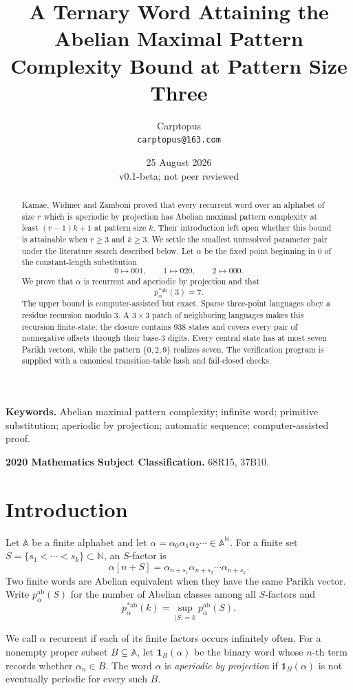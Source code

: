 \documentclass[11pt]{article}
\title{A Ternary Word Attaining the Abelian Maximal Pattern\\
Complexity Bound at Pattern Size Three}
\author{Carptopus\\\small\texttt{carptopus@163.com}}
\date{25 August 2026\\\small v0.1-beta; not peer reviewed}
\newcommand{\A}{\mathbb A}
\newcommand{\N}{\mathbb N}
\newcommand{\one}{\mathbf 1}
\begin{document}
\maketitle

\begin{abstract}
Kamae, Widmer and Zamboni proved that every recurrent word over an alphabet of
size $r$ which is aperiodic by projection has Abelian maximal pattern
complexity at least $(r-1)k+1$ at pattern size $k$. Their introduction left
open whether this bound is attainable when $r\ge3$ and $k\ge3$. We settle the
smallest unresolved parameter pair under the literature search described
below. Let $\alpha$ be the fixed point beginning in $0$ of the constant-length
substitution
\[
0\mapsto001,\qquad 1\mapsto020,\qquad 2\mapsto000.
\]
We prove that $\alpha$ is recurrent and aperiodic by projection and that
\[
p_{\alpha}^{*\mathrm{ab}}(3)=7.
\]
The upper bound is computer-assisted but exact. Sparse three-point languages
obey a residue recursion modulo $3$. A $3\times3$ patch of neighboring
languages makes this recursion finite-state; the closure contains 938 states
and covers every pair of nonnegative offsets through their base-$3$ digits.
Every central state has at most seven Parikh vectors, while the pattern
$\{0,2,9\}$ realizes seven. The verification program is supplied with a
canonical transition-table hash and fail-closed checks.
\end{abstract}

\noindent\textbf{Keywords.} Abelian maximal pattern complexity; infinite word;
primitive substitution; aperiodic by projection; automatic sequence;
computer-assisted proof.

\medskip
\noindent\textbf{2020 Mathematics Subject Classification.} 68R15, 37B10.

\section{Introduction}

Let $\A$ be a finite alphabet and let
$\alpha=\alpha_0\alpha_1\alpha_2\cdots\in\A^{\N}$. For a finite set
$S=\{s_1<\cdots<s_k\}\subset\N$, an $S$-factor is
\[
\alpha[n+S]=\alpha_{n+s_1}\alpha_{n+s_2}\cdots\alpha_{n+s_k}.
\]
Two finite words are Abelian equivalent when they have the same Parikh vector.
Write $p_\alpha^{\mathrm{ab}}(S)$ for the number of Abelian classes among all
$S$-factors and
\[
p_\alpha^{*\mathrm{ab}}(k)
=\sup_{|S|=k}p_\alpha^{\mathrm{ab}}(S).
\]

We call $\alpha$ recurrent if each of its finite factors occurs infinitely
often. For a nonempty proper subset $B\subsetneq\A$, let
$\one_B(\alpha)$ be the binary word whose $n$-th term records whether
$\alpha_n\in B$. The word $\alpha$ is \emph{aperiodic by projection} if
$\one_B(\alpha)$ is not eventually periodic for every such $B$.
\end{document}
